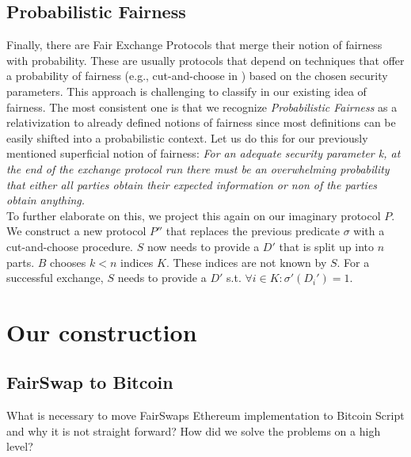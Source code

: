 \documentclass{cacthesis}
\begin{document}
        \section{Probabilistic Fairness}
        Finally, there are Fair Exchange Protocols that merge their notion of fairness with probability. These are usually protocols that depend on techniques that offer a probability of fairness (e.g., cut-and-choose in \cite{DELGADOSEGURA2020832}) based on the chosen security parameters. This approach is challenging to classify in our existing idea of fairness. The most consistent one is that we recognize \textit{Probabilistic Fairness} as a relativization to already defined notions of fairness since most definitions can be easily shifted into a probabilistic context. Let us do this for our previously mentioned superficial notion of fairness: \textit{For an adequate security parameter k, at the end of the exchange protocol run there must be an overwhelming probability that either all parties obtain their expected information or non of the parties obtain anything.} \\
        To further elaborate on this, we project this again on our imaginary protocol $P$. We construct a new protocol $P''$ that replaces the previous predicate $\sigma$ with a cut-and-choose procedure. $S$ now needs to provide a $D'$ that is split up into $n$ parts. $B$ chooses $k < n$ indices $K$. These indices are not known by $S$. For a successful exchange, $S$ needs to provide a $D'$ s.t. $\forall i\in K:\sigma'\left( D_{i}'\right) =1$. \\

        
		
	\chapter{Our construction}
	   
	   \section{FairSwap to Bitcoin}
        What is necessary to move FairSwaps Ethereum implementation to Bitcoin Script and why it is not straight forward? How did we solve the problems on a high level? 
        
\end{document}
